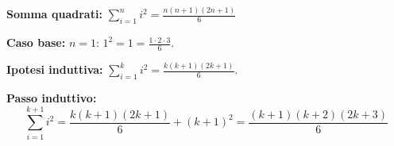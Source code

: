 \begin{esempio}
\textbf{Somma quadrati: }$\displaystyle\sum_{i=1}^n i^2 = \frac{n(n+1)(2n+1)}{6}$

\textbf{Caso base:} $n=1$: $1^2=1=\frac{1\cdot2\cdot3}{6}$.

\textbf{Ipotesi induttiva:} $\sum_{i=1}^k i^2=\frac{k(k+1)(2k+1)}{6}$.

\textbf{Passo induttivo:}
\[
\sum_{i=1}^{k+1} i^2 = \frac{k(k+1)(2k+1)}{6} + (k+1)^2 = \frac{(k+1)(k+2)(2k+3)}{6}
\]

\end{esempio}












